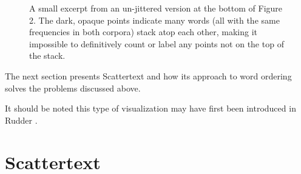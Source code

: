 \documentclass[11pt]{article}
\begin{document}
\vspace{-.25cm}
\begin{figure}
\label{nojitterfig}
\caption{A small excerpt from an un-jittered version at the bottom of Figure 2.  The dark, opaque points indicate many words (all with the same frequencies in both corpora) stack atop each other, making it impossible to definitively count or label any points not on the top of the stack.}
\end{figure}
\vspace{-.5cm}

The next section presents Scattertext and how its approach to word ordering solves the problems discussed above.

It should be noted this type of visualization may have first been introduced in Rudder .

\section{Scattertext}
\label{scattertext}
\end{document}
